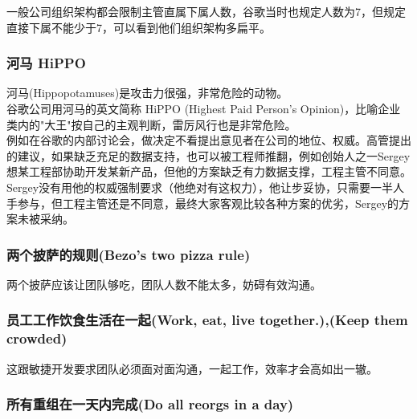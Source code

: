 一般公司组织架构都会限制主管直属下属人数，谷歌当时也规定人数为7，但规定直接下属不能少于7，可以看到他们组织架构多扁平。

\hypertarget{ux6cb3ux9a6c-hippo}{%
\subsubsection{河马 HiPPO}\label{ux6cb3ux9a6c-hippo}}

河马(Hippopotamuses)是攻击力很强，非常危险的动物。\\
谷歌公司用河马的英文简称 HiPPO (Highest Paid Person's
Opinion)，比喻企业类内的"大王"按自己的主观判断，雷厉风行也是非常危险。\\
例如在谷歌的内部讨论会，做决定不看提出意见者在公司的地位、权威。高管提出的建议，如果缺乏充足的数据支持，也可以被工程师推翻，例如创始人之一Sergey想某工程部协助开发某新产品，但他的方案缺乏有力数据支撑，工程主管不同意。Sergey没有用他的权威强制要求（他绝对有这权力），他让步妥协，只需要一半人手参与，但工程主管还是不同意，最终大家客观比较各种方案的优劣，Sergey的方案未被采纳。


\hypertarget{ux4e24ux4e2aux62abux8428ux7684ux89c4ux5219bezos-two-pizza-rule}{%
\subsubsection{两个披萨的规则(Bezo's two pizza
rule)}\label{ux4e24ux4e2aux62abux8428ux7684ux89c4ux5219bezos-two-pizza-rule}}

两个披萨应该让团队够吃，团队人数不能太多，妨碍有效沟通。

\hypertarget{ux5458ux5de5ux5de5ux4f5cux996eux98dfux751fux6d3bux5728ux4e00ux8d77work-eat-live-together.keep-them-crowded}{%
\subsubsection{员工工作饮食生活在一起(Work, eat, live together.),(Keep
them
crowded)}\label{ux5458ux5de5ux5de5ux4f5cux996eux98dfux751fux6d3bux5728ux4e00ux8d77work-eat-live-together.keep-them-crowded}}

这跟敏捷开发要求团队必须面对面沟通，一起工作，效率才会高如出一辙。

\hypertarget{ux6240ux6709ux91cdux7ec4ux5728ux4e00ux5929ux5185ux5b8cux6210do-all-reorgs-in-a-day}{%
\subsubsection{所有重组在一天内完成(Do all reorgs in a
day)}\label{ux6240ux6709ux91cdux7ec4ux5728ux4e00ux5929ux5185ux5b8cux6210do-all-reorgs-in-a-day}}

